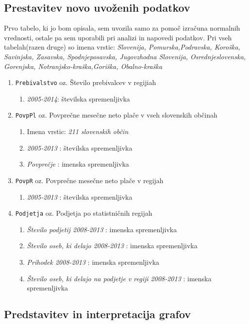 \documentclass[11pt,a4paper]{article}
\begin{document}
\subsection{Prestavitev novo uvoženih podatkov}
Prvo tabelo, ki jo bom opisala, sem uvozila samo za pomoč izračuna normalnih vrednosti, ostale pa sem uporabili pri analizi in napovedi podatkov. Pri vseh tabelah(razen druge) so imena vrstic: \textit{Slovenija, Pomurska,Podravska, Koroška, Savinjska, Zasavska, Spodnjeposavska, Jugovzhodna Slovenija, Osrednjeslovenska, Gorenjska, Notranjsko-kraška,Goriška, Obalno-kraška}
\begin{enumerate}
\item \verb+Prebivalstvo+ oz. Število prebivalcev v regijiah
\begin{enumerate}
\item \textit{2005-2014}: številska spremenljivka
\end{enumerate}
\item \verb+PovpPl+ oz. Povprečne mesečne neto plače v vseh slovenskih občinah
\begin{enumerate}
\item Imena vrstic: \textit{211 slovenskih občin}
\item \textit{2005-2013} : številska spremenljivka
\item \textit{Povprečje} : imenska spremenljivka
\end{enumerate}
\item \verb+PovpR+ oz. Povprečne mesečne neto plače v regijah
\begin{enumerate}
\item \textit{2005-2013} : številska spremenljivka
\end{enumerate}
\item \verb+Podjetja+ oz. Podjetja po statistničnih regijah
\begin{enumerate}
\item \textit{Število podjetij 2008-2013} : imenska spremenljivka
\item \textit{Število oseb, ki delajo 2008-2013} : imenska spremenljivka
\item \textit{Prihodek 2008-2013} : imenska spremenljivka
\item \textit{Število oseb, ki delajo na podjetje v regiji 2008-2013} : imenska spremenljivka
\end{enumerate}
\end{enumerate}
\subsection{Predstavitev in interpretacija grafov}

\end{document}
